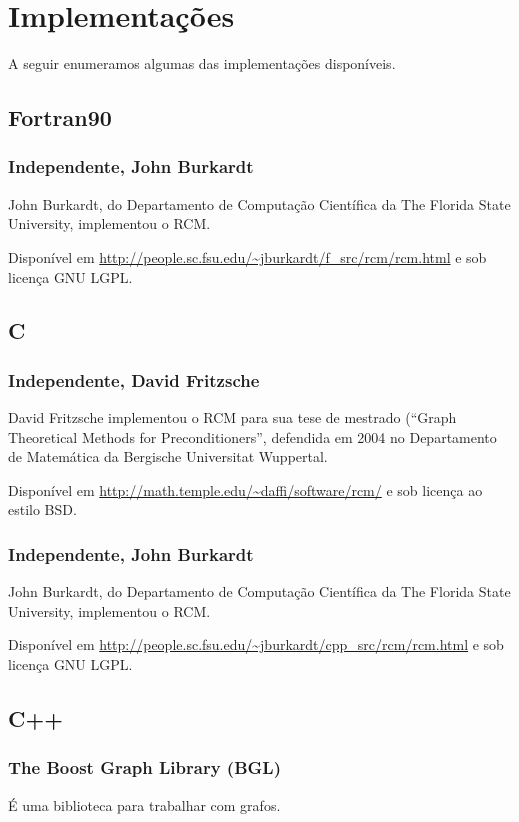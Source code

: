 \section{Implementações}
A seguir enumeramos algumas das implementações disponíveis.

\subsection{Fortran90}
\subsubsection{Independente, John Burkardt}
John Burkardt, do Departamento de Computação Científica da The Florida State
University, implementou o RCM.

Disponível em \url{http://people.sc.fsu.edu/~jburkardt/f_src/rcm/rcm.html} e
sob licença GNU LGPL.

\subsection{C}
\subsubsection{Independente, David Fritzsche}
David Fritzsche implementou o RCM para sua tese de mestrado (``Graph
Theoretical Methods for Preconditioners'', defendida em 2004 no
Departamento de Matemática da Bergische Universitat Wuppertal. 

Disponível em \url{http://math.temple.edu/~daffi/software/rcm/} e sob licença ao
estilo BSD.

\subsubsection{Independente, John Burkardt}
John Burkardt, do Departamento de Computação Científica da The Florida State
University, implementou o RCM.

Disponível em \url{http://people.sc.fsu.edu/~jburkardt/cpp_src/rcm/rcm.html} e
sob licença GNU LGPL.

\subsection{C++}
\subsubsection{The Boost Graph Library (BGL)}
É uma biblioteca para trabalhar com grafos.

